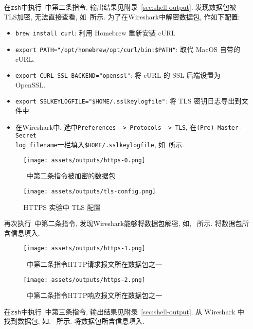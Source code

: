 \documentclass{ned-article}
\begin{document}
在\texttt{zsh}中执行~中第二条指令, 输出结果见附录~\ref{sec:shell-output}. 发现数据包被TLS加密, 无法直接查看, 如~所示. 为了在Wireshark中解密数据包, 作如下配置:
\begin{itemize}[noitemsep]
    \item \texttt{brew install curl}: 利用 Homebrew 重新安装 cURL
    \item \texttt{export PATH="/opt/homebrew/opt/curl/bin:\$PATH"}: 取代 MacOS 自带的 cURL.
    \item \texttt{export CURL_SSL_BACKEND="openssl"}: 将 cURL 的 SSL 后端设置为 OpenSSL.
    \item \texttt{export SSLKEYLOGFILE="\$HOME/.sslkeylogfile"}: 将 TLS 密钥日志导出到文件中.
    \item 在Wireshark中, 选中\texttt{Preferences -> Protocols -> TLS}, 在\texttt{(Pre)-Master-Secret\\ log filename}一栏填入\texttt{\$HOME/.sslkeylogfile}, 如~所示.
\end{itemize}

\begin{figure}[H]
    \centering
    \texttt{[image: assets/outputs/https-0.png]}
    \caption{~中第二条指令被加密的数据包}\label{fig:https-0}
\end{figure}

\begin{figure}[H]
    \centering
    \texttt{[image: assets/outputs/tls-config.png]}
    \caption{HTTPS 实验中 TLS 配置}\label{fig:tls-config}
\end{figure}

再次执行~中第二条指令, 发现Wireshark能够将数据包解密, 如, ~所示. 将数据包所含信息填入.

\begin{figure}[H]
    \centering
    \texttt{[image: assets/outputs/https-1.png]}
    \caption{~中第二条指令HTTP请求报文所在数据包之一}\label{fig:https-1}
\end{figure}

\begin{figure}[H]
    \centering
    \texttt{[image: assets/outputs/https-2.png]}
    \caption{~中第二条指令HTTP响应报文所在数据包之一}\label{fig:https-2}
\end{figure}

在\texttt{zsh}中执行~中第三条指令, 输出结果见附录~\ref{sec:shell-output}. 从 Wireshark 中找到数据包, 如, ~所示. 将数据包所含信息填入.
\end{document}
